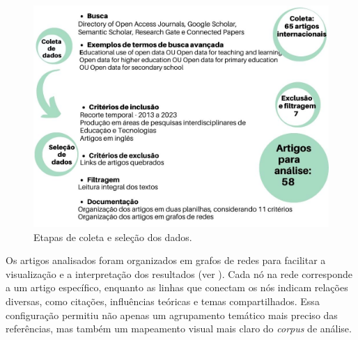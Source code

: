 \documentclass[portuguese]{textolivre}
\begin{document}
\begin{figure}[h]
\centering
\begin{minipage}{0.75\linewidth}
\includegraphics[width=\linewidth]{Fig1.png}
\caption{Etapas de coleta e seleção dos dados.}
\label{fig1}
\end{minipage}
\end{figure}

Os artigos analisados foram organizados em grafos de redes para facilitar a visualização e a interpretação dos resultados (ver ). Cada nó na rede corresponde a um artigo específico, enquanto as linhas que conectam os nós indicam relações diversas, como citações, influências teóricas e temas compartilhados. Essa configuração permitiu não apenas um agrupamento temático mais preciso das referências, mas também um mapeamento visual mais claro do \textit{corpus} de análise.
\end{document}
